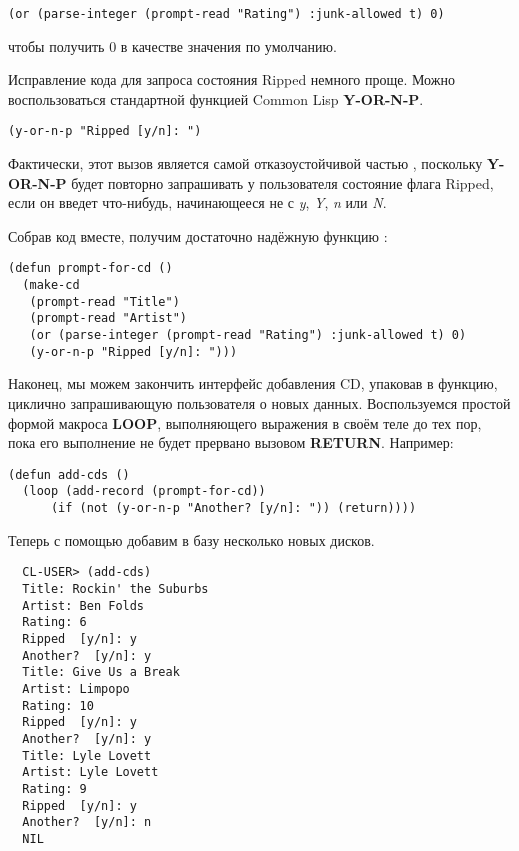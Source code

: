 \begin{lstlisting}
(or (parse-integer (prompt-read "Rating") :junk-allowed t) 0)
\end{lstlisting}

чтобы получить 0 в качестве значения по умолчанию.

Исправление кода для запроса состояния Ripped немного проще. Можно воспользоваться
стандартной функцией Common Lisp \textbf{Y-OR-N-P}.

\begin{lstlisting}
(y-or-n-p "Ripped [y/n]: ")
\end{lstlisting}

Фактически, этот вызов является самой отказоустойчивой частью ,
поскольку \textbf{Y-OR-N-P} будет повторно запрашивать у пользователя состояние флага
Ripped, если он введет что-нибудь, начинающееся не с \textit{y}, \textit{Y}, \textit{n}
или \textit{N}.

Собрав код вместе, получим достаточно надёжную функцию :

\begin{lstlisting}
(defun prompt-for-cd ()
  (make-cd
   (prompt-read "Title")
   (prompt-read "Artist")
   (or (parse-integer (prompt-read "Rating") :junk-allowed t) 0)
   (y-or-n-p "Ripped [y/n]: ")))
\end{lstlisting}

Наконец, мы можем закончить интерфейс добавления CD, упаковав  в
функцию, циклично запрашивающую пользователя о новых данных. Воспользуемся простой формой
макроса \textbf{LOOP}, выполняющего выражения в своём теле до тех пор, пока его выполнение
не будет прервано вызовом \textbf{RETURN}. Например:

\begin{lstlisting}
(defun add-cds ()
  (loop (add-record (prompt-for-cd))
      (if (not (y-or-n-p "Another? [y/n]: ")) (return))))
\end{lstlisting}

Теперь с помощью  добавим в базу несколько новых дисков.

\begin{verbatim}
  CL-USER> (add-cds)
  Title: Rockin' the Suburbs
  Artist: Ben Folds
  Rating: 6
  Ripped  [y/n]: y
  Another?  [y/n]: y
  Title: Give Us a Break
  Artist: Limpopo
  Rating: 10
  Ripped  [y/n]: y
  Another?  [y/n]: y
  Title: Lyle Lovett
  Artist: Lyle Lovett
  Rating: 9
  Ripped  [y/n]: y
  Another?  [y/n]: n
  NIL
\end{verbatim}

